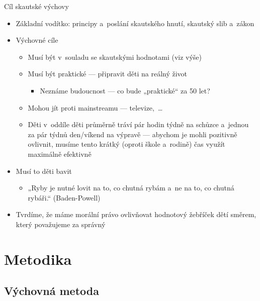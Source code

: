 \documentclass[compress, ucs, xelatex, xcolor=dvipsnames, print,
  hyperref={
    bookmarks=true,
    unicode=true,
    colorlinks=true,
    plainpages=false,
    pdfkeywords={Skaut, Junak, Skauting, Vychovna metoda},
    linkcolor=Black,
    anchorcolor=Black,
    citecolor=OliveGreen,
    filecolor=OliveGreen,
    menucolor=Black,
    urlcolor=OliveGreen,
    pdftex}
  ]{beamer}
\begin{document}
\begin{frame}{Cíl skautské výchovy}
  \begin{itemize}
    \item Základní vodítko: principy a~poslání skautského hnutí, skautský slib a~zákon
    \item Výchovné cíle
    \begin{itemize}
      \item Musí být v~souladu se skautskými hodnotami (viz výše)
      \item Musí být praktické --- připravit děti na reálný život
      \begin{itemize}
	\item Neznáme budoucnost --- co bude „praktické“ za 50 let?
      \end{itemize}
      \item Mohou jít proti mainstreamu --- televize,~\ldots
      \item Děti v~oddíle děti průměrně tráví pár hodin týdně na schůzce a~jednou za pár týdnů den/víkend na výpravě --- abychom je mohli pozitivně ovlivnit, musíme tento krátký (oproti škole a~rodině) čas využít maximálně efektivně
    \end{itemize}
    \item Musí to děti bavit
      \begin{itemize}
	\item „Ryby je nutné lovit na to, co chutná rybám a~ne na to, co chutná rybáři.“ (Baden-Powell)
      \end{itemize}
    \item Tvrdíme, že máme morální právo ovlivňovat hodnotový žebříček dětí směrem, který považujeme za správný
  \end{itemize}
\end{frame}

\section{Metodika}

\subsection{Výchovná metoda}
\end{document}

